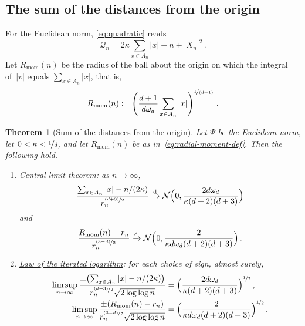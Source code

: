 \documentclass[11pt]{amsart}
\theoremstyle{plain}
\newtheorem{theorem}{Theorem}[section]
\theoremstyle{definition}
\newcommand{\drift}{\kappa}
\newcommand{\gauge}{\Psi}
\newcommand{\nf}{\nicefrac}
\newcommand{\Rmom}{R_{\mathrm{mom}}}
\numberwithin{equation}{section}
\begin{document}
\subsection{The sum of the distances from the origin}

For the Euclidean norm, \eqref{eq:quadratic} reads
\begin{equation}\label{eq:moment-martingale}
\mathcal Q_n=2\drift\sum_{x\in A_n}|x|-n+|X_n|^2\, .
\end{equation}
Let $\Rmom(n)$ be the radius of the ball about the origin on which the integral of~$|v|$ equals $\sum_{x\in A_n}|x|$, that is,
\begin{equation}\label{eq:radial-moment-def}
\Rmom(n)\coloneqq\left(\frac{d+1}{d\omega_d}\sum_{x\in A_n}|x|\right)^{\nf{1}{(d+1)}}\, .
\end{equation}

\begin{theorem}[Sum of the distances from the origin]\label{thm:moment-fluctuations}
Let $\gauge$ be the Euclidean norm, let $0<\drift<\nf1d$, and let $\Rmom(n)$ be as in~\eqref{eq:radial-moment-def}. Then the following hold.
\begin{enumerate}[label=\textup{(\roman*)}]
\item \underline{\emph{Central limit theorem}}: as $n\to\infty$,
\begin{equation*}
\frac{\sum_{x\in A_n}|x|-n/(2\drift)}{r_n^{\nf{(d+3)}{2}}}
\xrightarrow{\mathrm d}\mathcal N\Bigl(0,\frac{2d\omega_d}{\drift(d+2)(d+3)}\Bigr)
\end{equation*}
and
\begin{equation*}
\frac{\Rmom(n)-r_n}{r_n^{\nf{(3-d)}{2}}}
\xrightarrow{\mathrm d}\mathcal N\Bigl(0,\frac{2}{\drift d\omega_d(d+2)(d+3)}\Bigr)\, .
\end{equation*}
\item \underline{\emph{Law of the iterated logarithm}}: for each choice of sign, almost surely,
\begin{align}
\limsup_{n\to\infty}\frac{\pm\bigl(\sum_{x\in A_n}|x|-n/(2\drift)\bigr)}{r_n^{\nf{(d+3)}{2}}\sqrt{2\log\log n}}
&=\Bigl(\frac{2d\omega_d}{\drift(d+2)(d+3)}\Bigr)^{\nf12}\, ,\notag\\
\limsup_{n\to\infty}\frac{\pm(\Rmom(n)-r_n)}{r_n^{\nf{(3-d)}{2}}\sqrt{2\log\log n}}
&=\Bigl(\frac{2}{\drift d\omega_d(d+2)(d+3)}\Bigr)^{\nf12}\, .\label{eq:moment-radius-lil}
\end{align}
\end{enumerate}
\end{theorem}
\end{document}
